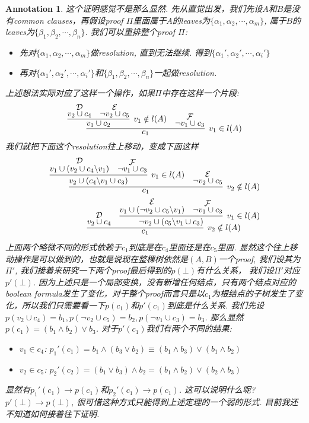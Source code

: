 \documentclass{article}
\newtheorem{annotation}[theorem]{Annotation}
\begin{document}
\begin{annotation}
\rm 这个证明感觉不是那么显然. 先从直觉出发，我们先设$A$和$B$是没有common clauses，再假设proof $\varPi$里面属于$A$的leaves为$\{\alpha_1, \alpha_2, \cdots, \alpha_m\}$, 属于$B$的leaves为$\{\beta_1, \beta_2, \cdots, \beta_n\}$. 我们可以重排整个proof $\varPi$: 
\begin{itemize}
	\item 先对$\{\alpha_1, \alpha_2, \cdots, \alpha_m\}$做resolution, 直到无法继续. 得到$\{\alpha_1', \alpha_2', \cdots, \alpha_i'\}$
	\item 再对$\{\alpha_1', \alpha_2', \cdots, \alpha_i'\}$和$\{\beta_1, \beta_2, \cdots, \beta_n\}$一起做resolution.
\end{itemize}
上述想法实际对应了这样一个操作，如果$\varPi$中存在这样一个片段:
\[
	\infer[v_1 \in l(A)]{c_1}{\infer[v_1 \notin l(A)]{v_1 \cup c_2}{\deduce{v_2 \cup c_4}{\mathcal{D}} & \deduce{\neg v_2 \cup c_5}{\mathcal{E}}} & \deduce{\neg v_1 \cup c_3}{\mathcal{F}}}
\]
我们就把下面这个resolution往上移动，变成下面这样
\[
	\begin{aligned}
	\infer[v_2 \notin l(A)]{c_1}{\infer[v_1 \in l(A)]{v_2 \cup (c_4 \backslash v_1 \cup c_3)}{\deduce{v_1 \cup (v_2 \cup c_4 \backslash v_1)}{\mathcal{D}} & \deduce{\neg v_1 \cup c_3}{\mathcal{F}}} & \deduce{\neg v_2 \cup c_5}{\mathcal{E}}}\\ 
	\infer[v_2 \notin l(A)]{c_1}{\deduce{v_2 \cup c_4 }{\mathcal{D}} & \infer[v_1 \in l(A)]{\neg v_2 \cup (c_5 \backslash v_1 \cup c_3)}{\deduce{v_1 \cup (\neg v_2 \cup c_5 \backslash v_1)}{\mathcal{E}} & \deduce{\neg v_1 \cup c_3}{\mathcal{F}}}}
	\end{aligned}
\]
上面两个略微不同的形式依赖于$c_1$到底是在$c_4$里面还是在$c_5$里面. 显然这个往上移动操作是可以做到的，也就是说现在整棵树依然是$(A,B)$一个proof, 我们设其为$\varPi'$, 我们接着来研究一下两个proof最后得到的$p(\bot)$有什么关系， 我们设$\varPi'$对应$p'(\bot)$. 因为上述只是一个局部变换，没有新增任何结点，只有两个结点对应的boolean formula发生了变化，对于整个proof而言只是以$c_1$为根结点的子树发生了变化，所以我们只需要看一下$p(c_1)$和$p'(c_1)$到底是什么关系. 我们先设$p(v_2 \cup c_4) = b_1, p(\neg v_2 \cup c_5) = b_2, p(\neg v_1 \cup c_3) = b_3$. 那么显然$p(c_1) = (b_1 \wedge b_2) \vee b_3$. 对于$p'(c_1)$我们有两个不同的结果:
\begin{itemize}
	\item $v_1 \in c_4$: $p_1'(c_1) = b_1 \wedge (b_3 \vee b_2) \equiv (b_1 \wedge b_3) \vee (b_1 \wedge b_2)$
	\item $v_2 \in c_5$: $p_2'(c_2) = (b_1 \vee b_3) \wedge b_2 = (b_1 \wedge b_2) \vee (b_2 \wedge b_3)$
\end{itemize}
显然有$p_1'(c_1) \to p(c_1)$和$p_2'(c_1) \to p(c_1)$. 这可以说明什么呢? $p'(\bot) \to p(\bot)$, 很可惜这种方式只能得到上述定理的一个弱的形式. 目前我还不知道如何接着往下证明.
\end{annotation}
\end{document}
